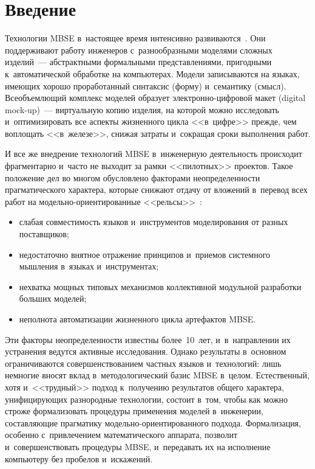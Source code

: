 
\thispagestyle{headings}

\begin{multicols}{2}

\label{st\stat}

\section{Введение}

   Технологии MBSE в~настоящее время интенсивно 
развиваются~\cite{1-kov}. Они поддерживают работу инженеров с~разнообразными 
моделями сложных изделий~--- абстрактными формальными пред\-став\-ле\-ни\-ями, 
пригодными к~автоматической обработке на компьютерах. Модели 
записываются на языках, имеющих хорошо проработанный синтаксис (форму) 
и~семантику (смысл). Всеобъемлющий комплекс моделей образует  
элект\-рон\-но-циф\-ро\-вой макет (digital mock-up)~--- виртуальную копию 
изделия, на которой можно исследовать и~оптимизировать все аспекты 
жизненного цикла <<в~цифре>> прежде, чем воплощать <<в~железе>>, снижая 
затраты и~сокращая сроки выполнения работ.
   
   И все же внедрение технологий MBSE в~инженерную деятельность 
происходит фрагментарно и~часто не выходит за рамки <<пилотных>> 
проектов. Такое положение дел во многом обусловлено факторами 
неопределенности прагматического характера, которые снижают отдачу от 
вложений в~перевод всех работ на мо\-дель\-но-ори\-ен\-ти\-ро\-ван\-ные 
<<рельсы>>~\cite{2-kov, 3-kov}:
   \begin{itemize}
\item слабая совместимость языков и~инструментов моделирования от разных 
поставщиков;
\item недостаточно внятное отражение принципов и~приемов сис\-тем\-но\-го 
мышления в~языках и~инструментах;
\item нехватка мощных типовых механизмов коллективной модульной 
разработки больших моделей;
\item неполнота автоматизации жизненного цикла артефактов MBSE.
\end{itemize}

   Эти факторы неопределенности известны более~10~лет, 
и~в~направлении их устранения ведутся активные исследования. Однако 
результаты в~основном ограничиваются совершенствованием частных языков 
и~технологий: лишь немногие вносят вклад в~методологический базис MBSE 
в~целом. Естественный, хотя и~<<трудный>> подход к~получению результатов 
общего характера, уни\-фи\-ци\-ру\-ющих разнородные технологии, состоит в~том, 
чтобы как можно строже формализовать процедуры применения моделей 
в~инженерии, составляющие прагматику  
мо\-дель\-но-ори\-ен\-ти\-ро\-ван\-но\-го подхода. Формализация, особенно 
с~привлечением математического аппарата, позволит и~совершенствовать 
процедуры MBSE, и~передавать их на исполнение компьютеру без пробелов 
и~искажений.
   

\end{multicols}
